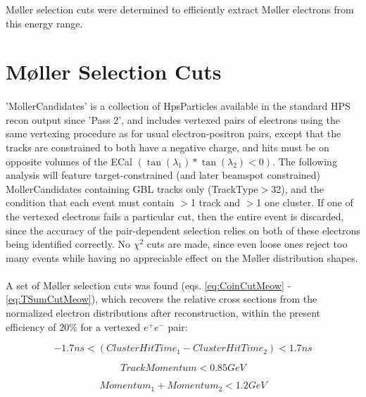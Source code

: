 \documentclass{article}
\begin{document}
M\o ller selection cuts were determined to efficiently extract M\o ller electrons from this energy range.

	\section{M\o ller Selection Cuts}
	\paragraph{}
	'MollerCandidates' is a collection of HpsParticles available in the standard HPS recon output since 'Pass 2', and includes vertexed pairs of electrons using the same vertexing procedure as for usual electron-positron pairs, except that the tracks are constrained to both have a negative charge, and hits must be on opposite volumes of the ECal $\left(\tan{\left(\lambda_1\right)}*\tan{\left(\lambda_2\right)}<0\right)$. The following analysis will feature target-constrained (and later beamspot constrained) MollerCandidates containing GBL tracks only (TrackType$>$32), and the condition that each event must contain $>$1 track and $>$1 one cluster. If one of the vertexed electrons fails a particular cut, then the entire event is discarded, since the accuracy of the pair-dependent selection relies on both of these electrons being identified correctly. No $\chi^{2}$ cuts are made, since even loose ones reject too many events while having no appreciable effect on the M\o ller distribution shapes.

\paragraph{}
A set of M\o ller selection cuts was found (eqs. \ref{eq:CoinCutMeow} - \ref{eq:TSumCutMeow}), which recovers the relative cross sections from the normalized electron distributions after reconstruction, within the present efficiency of $20\%$ for a vertexed $e^+e^-$ pair:

           \begin{equation} \label{eq:CoinCutMeow}
  	-1.7 ns < (Cluster Hit Time_{1} - Cluster Hit Time_{2}) < 1.7 ns
	\end{equation}
	
	\begin{equation} \label{eq:PCut}
  	 Track Momentum<0.85 GeV
	\end{equation}
	
          \begin{equation} \label{eq:PSumCut}
  	Momentum_1 + Momentum_2<1.2 GeV
	\end{equation}
\end{document}
